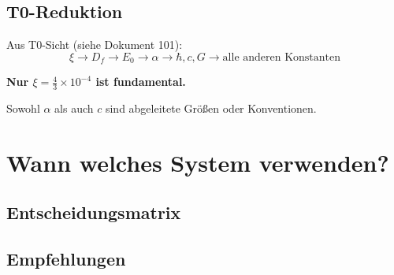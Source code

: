 	\subsection{T0-Reduktion}
	
	Aus T0-Sicht (siehe Dokument 101):
	\begin{equation}
		\xi \to D_f \to E_0 \to \alpha \to \hbar, c, G \to \text{alle anderen Konstanten}
	\end{equation}
	
	\textbf{Nur $\xi = \frac{4}{3} \times 10^{-4}$ ist fundamental.}
	
	Sowohl $\alpha$ als auch $c$ sind abgeleitete Größen oder Konventionen.
	
	\section{Wann welches System verwenden?}
	
	\subsection{Entscheidungsmatrix}
	
	\begin{table}[h]
		\centering
		\caption{Anwendungsbereiche der Einheitensysteme}
	\end{table}
	
	\subsection{Empfehlungen}
	

